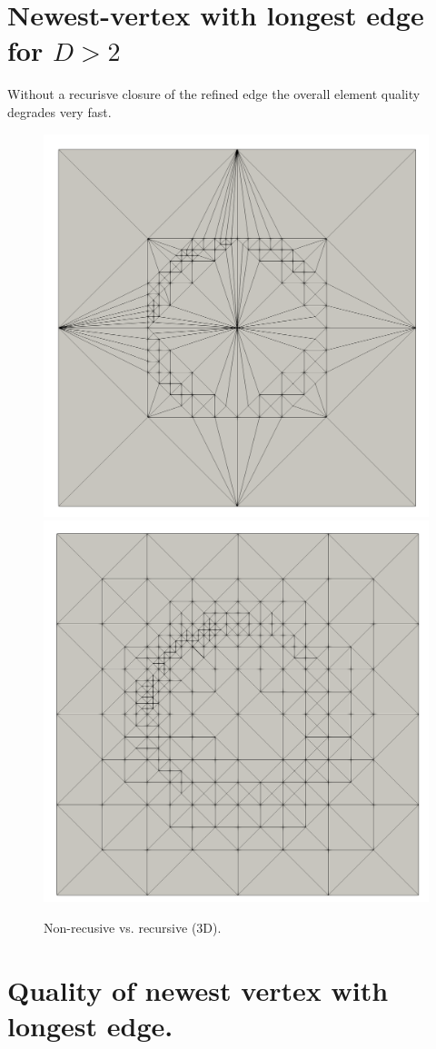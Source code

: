 \documentclass{article}
\begin{document}
\clearpage

\section{Newest-vertex with longest edge for $D>2$}

Without a recurisve closure of the refined edge the overall element quality degrades very fast.

\begin{figure}[htbp]
	\centering
	\includegraphics[width=0.48\linewidth]{figures/non-recursive} \hfill
	\includegraphics[width=0.48\linewidth]{figures/recursive}
	\caption{Non-recusive vs. recursive (3D).}
	\label{fig:metrics}
\end{figure}

\section{Quality of newest vertex with longest edge.}
\end{document}
